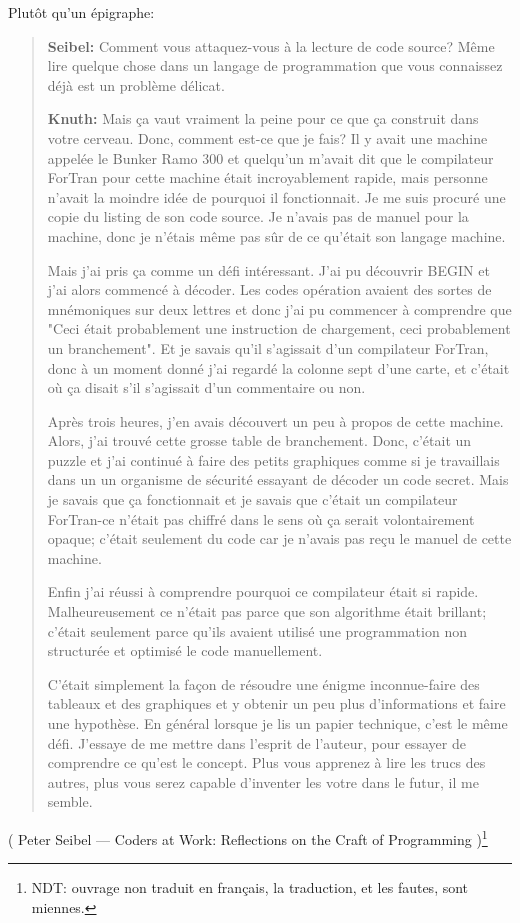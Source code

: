 Plutôt qu'un épigraphe:

\begin{framed}
\begin{quotation}

\textbf{Seibel:} Comment vous attaquez-vous à la lecture de code source? Même lire
quelque chose dans un langage de programmation que vous connaissez déjà est un problème
délicat.

\textbf{Knuth:} Mais ça vaut vraiment la peine pour ce que ça construit dans votre
cerveau. Donc, comment est-ce que je fais? Il y avait une machine appelée le Bunker
Ramo 300 et quelqu'un m'avait dit que le compilateur ForTran pour cette machine était
incroyablement rapide, mais personne n'avait la moindre idée de pourquoi il fonctionnait.
Je me suis procuré une copie du listing de son code source. Je n'avais pas de manuel
pour la machine, donc je n'étais même pas sûr de ce qu'était son langage machine.

Mais j'ai pris ça comme un défi intéressant. J'ai pu découvrir BEGIN et j'ai alors
commencé à décoder. Les codes opération avaient des sortes de mnémoniques sur deux
lettres et donc j'ai pu commencer à comprendre que "Ceci était probablement une
instruction de chargement, ceci probablement un branchement". Et je savais qu'il
s'agissait d'un compilateur ForTran, donc à un moment donné j'ai regardé la colonne
sept d'une carte, et c'était où ça disait s'il s'agissait d'un commentaire
ou non.

Après trois heures, j'en avais découvert un peu à propos de cette machine. Alors,
j'ai trouvé cette grosse table de branchement. Donc, c'était un puzzle et j'ai continué
à faire des petits graphiques comme si je travaillais dans un un organisme de sécurité
essayant de décoder un code secret. Mais je savais que ça fonctionnait et je savais
que c'était un compilateur ForTran-ce n'était pas chiffré dans le sens où ça serait
volontairement opaque; c'était seulement du code car je n'avais pas reçu le manuel
de cette machine.

Enfin j'ai réussi à comprendre pourquoi ce compilateur était si rapide.
Malheureusement ce n'était pas parce que son algorithme était brillant; c'était
seulement parce qu'ils avaient utilisé une programmation non structurée et optimisé
le code manuellement.

C'était simplement la façon de résoudre une énigme inconnue-faire des tableaux et
des graphiques et y obtenir un peu plus d'informations et faire une hypothèse. En
général lorsque je lis un papier technique, c'est le même défi. J'essaye de me mettre
dans l'esprit de l'auteur, pour essayer de comprendre ce qu'est le concept. Plus
vous apprenez à lire les trucs des autres, plus vous serez capable d'inventer les
votre dans le futur, il me semble.

\end{quotation}
\end{framed}

( Peter Seibel --- Coders at Work: Reflections on the Craft of Programming )\footnote{NDT:
ouvrage non traduit en français, la traduction, et les fautes, sont miennes.}

